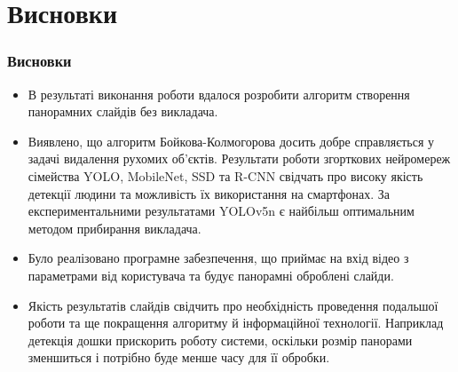\section{Висновки}
\begin{frame}
  \frametitle{Висновки}
  \begin{itemize}
    \item В результаті виконання роботи вдалося розробити алгоритм створення панорамних слайдів без викладача.
    \item Виявлено, що алгоритм Бойкова-Колмогорова досить добре справляється у задачі видалення рухомих об'єктів.
          Результати роботи згорткових нейромереж сімейства YOLO, MobileNet, SSD та
          R-CNN свідчать про високу якість детекції людини та можливість
          їх використання на смартфонах. За експериментальними результатами YOLOv5n є найбільш оптимальним
          методом прибирання викладача.
    \item Було реалізовано програмне забезпечення,
          що приймає на вхід відео з параметрами від користувача та
          будує панорамні оброблені слайди.
    \item Якість результатів слайдів свідчить про необхідність проведення подальшої роботи та
          ще покращення алгоритму й інформаційної технології. Наприклад детекція дошки прискорить
          роботу системи, оскільки розмір панорами зменшиться і потрібно буде менше часу для її обробки.
  \end{itemize}








\end{frame}
